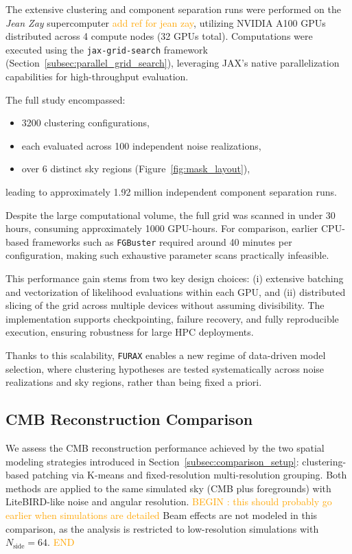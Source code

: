 \documentclass[fleqn,usenatbib]{mnras}
\newcommand{\je}[1]{\textcolor{orange}{#1}}
\begin{document}
The extensive clustering and component separation runs were performed on the \textit{Jean Zay} supercomputer \je{add ref for jean zay}, utilizing NVIDIA A100 GPUs distributed across 4 compute nodes (32 GPUs total). Computations were executed using the \texttt{jax-grid-search} framework (Section~\ref{subsec:parallel_grid_search}), leveraging JAX's native parallelization capabilities for high-throughput evaluation.

The full study encompassed:
\begin{itemize}
    \item 3200 clustering configurations,
    \item each evaluated across 100 independent noise realizations,
    \item over 6 distinct sky regions (Figure~\ref{fig:mask_layout}),
\end{itemize}
leading to approximately 1.92 million independent component separation runs.

Despite the large computational volume, the full grid was scanned in under 30 hours, consuming approximately 1000 GPU-hours. For comparison, earlier CPU-based frameworks such as \texttt{FGBuster} required around 40 minutes per configuration, making such exhaustive parameter scans practically infeasible.

This performance gain stems from two key design choices: (i) extensive batching and vectorization of likelihood evaluations within each GPU, and (ii) distributed slicing of the grid across multiple devices without assuming divisibility. The implementation supports checkpointing, failure recovery, and fully reproducible execution, ensuring robustness for large HPC deployments.

Thanks to this scalability, \texttt{FURAX} enables a new regime of data-driven model selection, where clustering hypotheses are tested systematically across noise realizations and sky regions, rather than being fixed a priori.

\subsection{CMB Reconstruction Comparison}
\label{subsec:cmb_reconstruction}

We assess the CMB reconstruction performance achieved by the two spatial modeling strategies introduced in Section~\ref{subsec:comparison_setup}: clustering-based patching via K-means and fixed-resolution multi-resolution grouping. Both methods are applied to the same simulated sky (CMB plus foregrounds) with LiteBIRD-like noise and angular resolution. \je{BEGIN : this should probably go earlier when simulations are detailed} Beam effects are not modeled in this comparison, as the analysis is restricted to low-resolution simulations with \( N_{\text{side}} = 64 \). \je{END}
\end{document}
